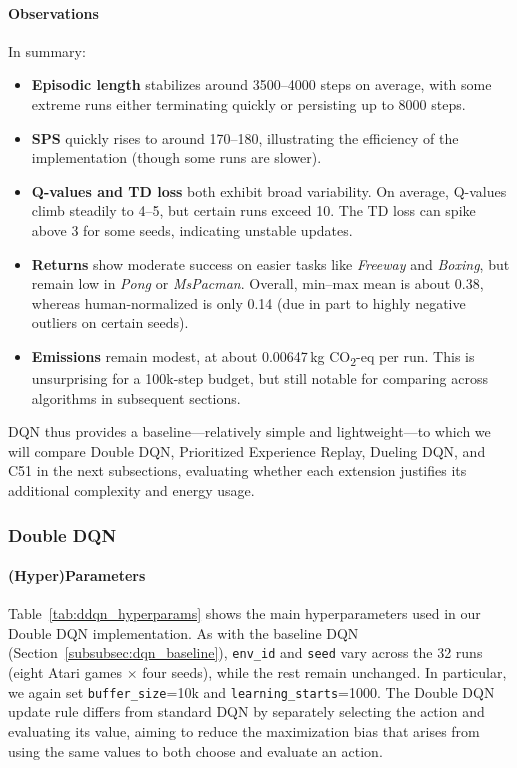 \paragraph{Observations}
In summary:
\begin{itemize}
	\item \textbf{Episodic length} stabilizes around 3500--4000 steps on average, 
	with some extreme runs either terminating quickly or persisting up to 8000 steps.
	\item \textbf{SPS} quickly rises to around 170--180, illustrating the efficiency 
	of the implementation (though some runs are slower).
	\item \textbf{Q-values and TD loss} both exhibit broad variability. On average, 
	Q-values climb steadily to 4--5, but certain runs exceed 10. The TD loss 
	can spike above 3 for some seeds, indicating unstable updates.
	\item \textbf{Returns} show moderate success on easier tasks like \textit{Freeway} 
	and \textit{Boxing}, but remain low in \textit{Pong} or \textit{MsPacman}. Overall, 
	min--max mean is about 0.38, whereas human-normalized is only 0.14 (due in part 
	to highly negative outliers on certain seeds).
	\item \textbf{Emissions} remain modest, at about 0.00647\,kg CO\textsubscript{2}-eq 
	per run. This is unsurprising for a 100k-step budget, but still notable for 
	comparing across algorithms in subsequent sections.
\end{itemize}

DQN thus provides a baseline—relatively simple and lightweight—to which we will 
compare Double DQN, Prioritized Experience Replay, Dueling DQN, and C51 
in the next subsections, evaluating whether each extension justifies 
its additional complexity and energy usage.


\subsubsection{Double DQN}
\label{subsubsec:double_dqn}

\paragraph{(Hyper)Parameters}
Table~\ref{tab:ddqn_hyperparams} shows the main hyperparameters used in our Double DQN implementation.  
As with the baseline DQN (Section~\ref{subsubsec:dqn_baseline}), \texttt{env\_id} and \texttt{seed} vary across the 32 runs (eight Atari games $\times$ four seeds), while the rest remain unchanged. In particular, we again set \texttt{buffer\_size}=10k and \texttt{learning\_starts}=1000. 
The Double DQN update rule differs from standard DQN by separately selecting the action and evaluating its value, aiming to reduce the maximization bias that arises from using the same values to both choose and evaluate an action.

